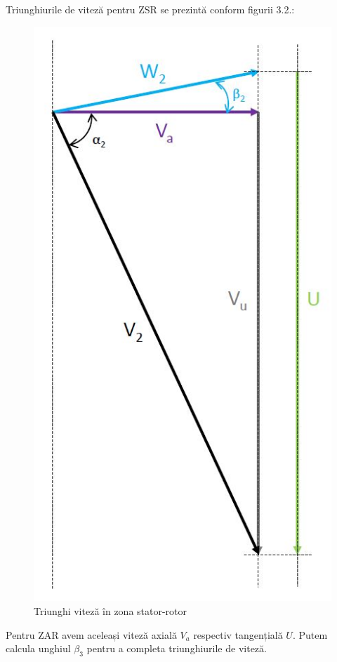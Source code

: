 Triunghiurile de viteză pentru ZSR se prezintă conform figurii 3.2.:

\begin{figure}[h!]
	\centering
	\includegraphics[scale=0.4]{figures/triunghi_viteza_ZSR.jpg}
	\caption{Triunghi viteză în zona stator-rotor}
	\label{Triunghi viteză în zona stator-rotor}
\end{figure}

\clearpage

Pentru ZAR avem aceleași viteză axială $V_a$ respectiv tangențială $U$. Putem calcula unghiul $\beta_3$ pentru a completa triunghiurile de viteză.

